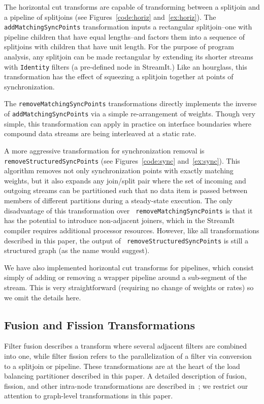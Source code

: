 The horizontal cut transforms are capable of transforming between a
splitjoin and a pipeline of splitjoins (see Figures~\ref{code:horiz}
and~\ref{ex:horiz}).  The {\tt addMatchingSyncPoints} transformation
inputs a rectangular splitjoin--one with pipeline children that have
equal lengths--and factors them into a sequence of splitjoins with
children that have unit length.  For the purpose of program analysis,
any splitjoin can be made rectangular by extending its shorter streams
with {\tt Identity} filters (a pre-defined node in StreamIt.)  Like an
hourglass, this transformation has the effect of squeezing a splitjoin
together at points of synchronization.

The {\tt removeMatchingSyncPoints} transformations directly implements
the inverse of {\tt addMatchingSyncPoints} via a simple re-arrangement
of weights.  Though very simple, this transformation can apply in
practice on interface boundaries where compound data streams are being
interleaved at a static rate.

A more aggressive transformation for synchronization removal is {\tt
removeStructuredSyncPoints} (see Figures~\ref{code:sync}
and~\ref{ex:sync}).  This algorithm removes not only synchronization
points with exactly matching weights, but it also expands any
join/split pair where the set of incoming and outgoing streams can be
partitioned such that no data item is passed between members of
different partitions during a steady-state execution.  The only
disadvantage of this transformation over {\tt
removeMatchingSyncPoints} is that it has the potential to introduce
non-adjacent joiners, which in the StreamIt compiler requires
additional processor resources.  However, like all transformations
described in this paper, the output of {\tt
removeStructuredSyncPoints} is still a structured graph (as the name
would suggest).

We have also implemented horizontal cut transforms for pipelines,
which consist simply of adding or removing a wrapper pipeline around a
sub-segment of the stream.  This is very straightforward (requiring no
change of weights or rates) so we omit the details here.

\subsection{Fusion and Fission Transformations}

Filter fusion describes a transform where several adjacent filters are
combined into one, while filter fission refers to the parallelization
of a filter via conversion to a splitjoin or pipeline.  These
transformations are at the heart of the load balancing partitioner
described in this paper.  A detailed description of fusion, fission,
and other intra-node transformations are described
in~\cite{streamit-asplos}; we restrict our attention to graph-level
transformations in this paper.

